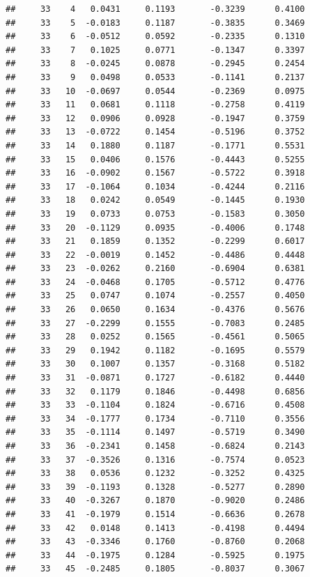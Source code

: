 \documentclass[
]{article}
\begin{document}
\begin{verbatim}
##     33    4   0.0431     0.1193       -0.3239      0.4100  
##     33    5  -0.0183     0.1187       -0.3835      0.3469  
##     33    6  -0.0512     0.0592       -0.2335      0.1310  
##     33    7   0.1025     0.0771       -0.1347      0.3397  
##     33    8  -0.0245     0.0878       -0.2945      0.2454  
##     33    9   0.0498     0.0533       -0.1141      0.2137  
##     33   10  -0.0697     0.0544       -0.2369      0.0975  
##     33   11   0.0681     0.1118       -0.2758      0.4119  
##     33   12   0.0906     0.0928       -0.1947      0.3759  
##     33   13  -0.0722     0.1454       -0.5196      0.3752  
##     33   14   0.1880     0.1187       -0.1771      0.5531  
##     33   15   0.0406     0.1576       -0.4443      0.5255  
##     33   16  -0.0902     0.1567       -0.5722      0.3918  
##     33   17  -0.1064     0.1034       -0.4244      0.2116  
##     33   18   0.0242     0.0549       -0.1445      0.1930  
##     33   19   0.0733     0.0753       -0.1583      0.3050  
##     33   20  -0.1129     0.0935       -0.4006      0.1748  
##     33   21   0.1859     0.1352       -0.2299      0.6017  
##     33   22  -0.0019     0.1452       -0.4486      0.4448  
##     33   23  -0.0262     0.2160       -0.6904      0.6381  
##     33   24  -0.0468     0.1705       -0.5712      0.4776  
##     33   25   0.0747     0.1074       -0.2557      0.4050  
##     33   26   0.0650     0.1634       -0.4376      0.5676  
##     33   27  -0.2299     0.1555       -0.7083      0.2485  
##     33   28   0.0252     0.1565       -0.4561      0.5065  
##     33   29   0.1942     0.1182       -0.1695      0.5579  
##     33   30   0.1007     0.1357       -0.3168      0.5182  
##     33   31  -0.0871     0.1727       -0.6182      0.4440  
##     33   32   0.1179     0.1846       -0.4498      0.6856  
##     33   33  -0.1104     0.1824       -0.6716      0.4508  
##     33   34  -0.1777     0.1734       -0.7110      0.3556  
##     33   35  -0.1114     0.1497       -0.5719      0.3490  
##     33   36  -0.2341     0.1458       -0.6824      0.2143  
##     33   37  -0.3526     0.1316       -0.7574      0.0523  
##     33   38   0.0536     0.1232       -0.3252      0.4325  
##     33   39  -0.1193     0.1328       -0.5277      0.2890  
##     33   40  -0.3267     0.1870       -0.9020      0.2486  
##     33   41  -0.1979     0.1514       -0.6636      0.2678  
##     33   42   0.0148     0.1413       -0.4198      0.4494  
##     33   43  -0.3346     0.1760       -0.8760      0.2068  
##     33   44  -0.1975     0.1284       -0.5925      0.1975  
##     33   45  -0.2485     0.1805       -0.8037      0.3067  

\end{verbatim}
\end{document}
